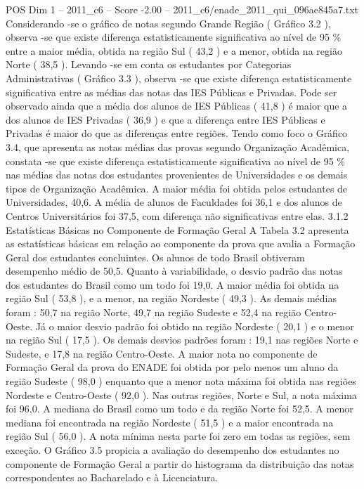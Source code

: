 \begin{textsample}{POS Dim 1 – 2011\_c6 – Score -2.00 – 2011\_c6/enade\_2011\_qui\_096ae845a7.txt}
Considerando -se o gráfico de notas segundo Grande Região ( Gráfico 3.2 ), observa -se que existe diferença estatisticamente significativa ao nível de 95 \% entre a maior média, obtida na região Sul ( 43,2 ) e a menor, obtida na região Norte ( 38,5 ).
Levando -se em conta os estudantes por Categorias Administrativas ( Gráfico 3.3 ), observa -se que existe diferença estatisticamente significativa entre as médias das notas das IES Públicas e Privadas.
Pode ser observado ainda que a média dos alunos de IES Públicas ( 41,8 ) é maior que a dos alunos de IES Privadas ( 36,9 ) e que a diferença entre IES Públicas e Privadas é maior do que as diferenças entre regiões.
Tendo como foco o Gráfico 3.4, que apresenta as notas médias das provas segundo Organização Acadêmica, constata -se que existe diferença estatisticamente significativa ao nível de 95 \% nas médias das notas dos estudantes provenientes de Universidades e os demais tipos de Organização Acadêmica.
A maior média foi obtida pelos estudantes de Universidades, 40,6.
A média de alunos de Faculdades foi 36,1 e dos alunos de Centros Universitários foi 37,5, com diferença não significativas entre elas. 3.1.2 Estatísticas Básicas no Componente de Formação Geral A Tabela 3.2 apresenta as estatísticas básicas em relação ao componente da prova que avalia a Formação Geral dos estudantes concluintes.
Os alunos de todo Brasil obtiveram desempenho médio de 50,5.
Quanto à variabilidade, o desvio padrão das notas dos estudantes do Brasil como um todo foi 19,0.
A maior média foi obtida na região Sul ( 53,8 ), e a menor, na região Nordeste ( 49,3 ).
As demais médias foram : 50,7 na região Norte, 49,7 na região Sudeste e 52,4 na região Centro-Oeste.
Já o maior desvio padrão foi obtido na região Nordeste ( 20,1 ) e o menor na região Sul ( 17,5 ).
Os demais desvios padrões foram : 19,1 nas regiões Norte e Sudeste, e 17,8 na região Centro-Oeste.
A maior nota no componente de Formação Geral da prova do ENADE foi obtida por pelo menos um aluno da região Sudeste ( 98,0 ) enquanto que a menor nota máxima foi obtida nas regiões Nordeste e Centro-Oeste ( 92,0 ).
Nas outras regiões, Norte e Sul, a nota máxima foi 96,0.
A mediana do Brasil como um todo e da região Norte foi 52,5.
A menor mediana foi encontrada na região Nordeste ( 51,5 ) e a maior encontrada na região Sul ( 56,0 ).
A nota mínima nesta parte foi zero em todas as regiões, sem exceção.
O Gráfico 3.5 propicia a avaliação do desempenho dos estudantes no componente de Formação Geral a partir do histograma da distribuição das notas correspondentes ao Bacharelado e à Licenciatura.

\end{textsample}

